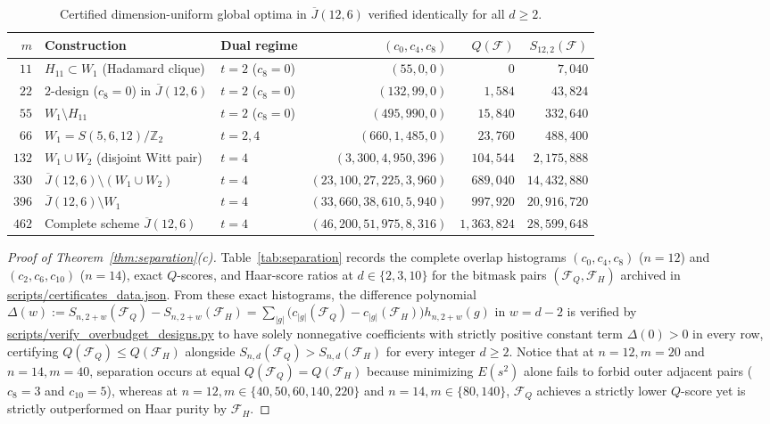 \documentclass[11pt,reqno]{amsart}
\theoremstyle{definition}
\theoremstyle{remark}
\newcommand{\Jbar}{\overline{J}}
\newcommand{\F}{\mathcal{F}}
\begin{document}
\begin{table}[htbp]
\centering
\caption{Certified dimension-uniform global optima in $\Jbar(12,6)$ verified identically for all $d \ge 2$.}
\label{tab:n12_optima}
\footnotesize
\begin{tabular}{@{}rllrrr@{}}
\toprule
$m$ & Construction & Dual regime & $(c_0, c_4, c_8)$ & $Q(\F)$ & $S_{12,2}(\F)$ \\
\midrule
$11$  & $H_{11} \subset W_1$ (Hadamard clique)        & $t=2$ ($c_8=0$) & $(55, 0, 0)$         & $0$       & $7{,}040$ \\
$22$  & $2$-design ($c_8=0$) in $\Jbar(12,6)$       & $t=2$ ($c_8=0$) & $(132, 99, 0)$       & $1{,}584$ & $43{,}824$ \\
$55$  & $W_1 \setminus H_{11}$                       & $t=2$ ($c_8=0$) & $(495, 990, 0)$      & $15{,}840$ & $332{,}640$ \\
$66$  & $W_1 = S(5,6,12)/\mathbb{Z}_2$               & $t=2,4$         & $(660, 1{,}485, 0)$       & $23{,}760$ & $488{,}400$ \\
$132$ & $W_1 \cup W_2$ (disjoint Witt pair)          & $t=4$           & $(3{,}300, 4{,}950, 396)$    & $104{,}544$ & $2{,}175{,}888$ \\
$330$ & $\Jbar(12,6) \setminus (W_1 \cup W_2)$       & $t=4$           & $(23{,}100, 27{,}225, 3{,}960)$ & $689{,}040$ & $14{,}432{,}880$ \\
$396$ & $\Jbar(12,6) \setminus W_1$                  & $t=4$           & $(33{,}660, 38{,}610, 5{,}940)$ & $997{,}920$ & $20{,}916{,}720$ \\
$462$ & Complete scheme $\Jbar(12,6)$                & $t=4$           & $(46{,}200, 51{,}975, 8{,}316)$ & $1{,}363{,}824$ & $28{,}599{,}648$ \\
\bottomrule
\end{tabular}
\end{table}

\begin{proof}[Proof of Theorem~\ref{thm:separation}(c)]
Table~\ref{tab:separation} records the complete overlap histograms $(c_0, c_4, c_8)$ ($n=12$) and $(c_2, c_6, c_{10})$ ($n=14$), exact $Q$-scores, and Haar-score ratios at $d \in \{2,3,10\}$ for the bitmask pairs $(\F_Q, \F_H)$ archived in \url{scripts/certificates_data.json}. From these exact histograms, the difference polynomial $\Delta(w) := S_{n, 2+w}(\F_Q) - S_{n, 2+w}(\F_H) = \sum_{|g|} \bigl(c_{|g|}(\F_Q) - c_{|g|}(\F_H)\bigr) h_{n,2+w}(g)$ in $w = d - 2$ is verified by \url{scripts/verify_overbudget_designs.py} to have solely nonnegative coefficients with strictly positive constant term $\Delta(0) > 0$ in every row, certifying $Q(\F_Q) \le Q(\F_H)$ alongside $S_{n,d}(\F_Q) > S_{n,d}(\F_H)$ for every integer $d \ge 2$. Notice that at $n=12, m=20$ and $n=14, m=40$, separation occurs at equal $Q(\F_Q)=Q(\F_H)$ because minimizing $E(s^2)$ alone fails to forbid outer adjacent pairs ($c_8=3$ and $c_{10}=5$), whereas at $n=12, m \in \{40,50,60,140,220\}$ and $n=14, m \in \{80,140\}$, $\F_Q$ achieves a strictly lower $Q$-score yet is strictly outperformed on Haar purity by $\F_H$.
\end{proof}
\end{document}
